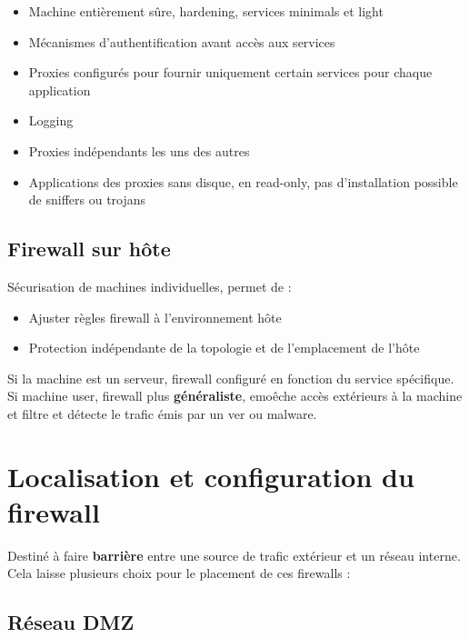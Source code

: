 \documentclass{report}
\begin{document}
			\begin{itemize}
				\item Machine entièrement sûre, hardening, services minimals et light
				\item Mécanismes d'authentification avant accès aux services
				\item Proxies configurés pour fournir uniquement certain services pour chaque application
				\item Logging
				\item Proxies indépendants les uns des autres
				\item Applications des proxies sans disque, en read-only, pas d'installation possible de sniffers ou trojans\\
			\end{itemize}

		\subsection{Firewall sur hôte}

			Sécurisation de machines individuelles, permet de : \\

			\begin{itemize}
				\item Ajuster règles firewall à l'environnement hôte
				\item Protection indépendante de la topologie et de l'emplacement de l'hôte\\
			\end{itemize}

			Si la machine est un serveur, firewall configuré en fonction du service spécifique.\\
			Si machine user, firewall plus \textbf{généraliste}, emoêche accès extérieurs à la machine et filtre et détecte le trafic émis par un ver ou malware.\\

	\section{Localisation et configuration du firewall}

		Destiné à faire \textbf{barrière} entre une source de trafic extérieur et un réseau interne.\\

		Cela laisse plusieurs choix pour le placement de ces firewalls : \\

		\subsection{Réseau DMZ}
\end{document}
